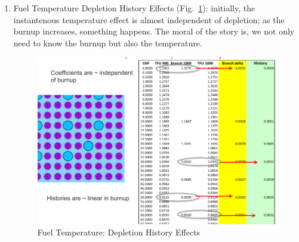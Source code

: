 \documentclass{school-22.211-notes}
\begin{document}
\begin{enumerate}
\item Fuel Temperature Depletion History Effects (Fig.~\ref{dhe}):
  initially, the instantenous temperature effect is almost independent
  of depletion; as the burnup increases, something happens. The moral
  of the story is, we not only need to know the burnup but also the
  temperature.
  \begin{figure}
    \centering
    \includegraphics[width=5in]{images/dfs/depletion-history-effect.png}
    \caption{Fuel Temperature: Depletion History Effects}  \label{dhe}
  \end{figure}


\end{enumerate}
\end{document}
